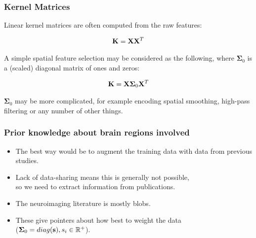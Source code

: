 
\begin{frame}
\frametitle{Kernel Matrices}
Linear kernel matrices are often computed from the raw features:\par
\begin{Large}
\begin{eqnarray*}
{\bf K} = {\bf X}{\bf X}^T
\end{eqnarray*}
\end{Large}
A simple spatial feature selection may be considered as the following, where $\boldsymbol\Sigma_0$ is a (scaled) diagonal matrix of ones and zeros:\par
\begin{Large}
\begin{eqnarray*}
{\bf K} = {\bf X}\boldsymbol\Sigma_0{\bf X}^T
\end{eqnarray*}
\end{Large}
$\boldsymbol\Sigma_0$ may be more complicated, for example encoding spatial smoothing, high-pass filtering or any number of other things.\par
\end{frame}

\begin{frame}
\frametitle{Prior knowledge about brain regions involved}
\begin{itemize}
\item The best way would be to augment the training data with data from previous studies.
\item Lack of data-sharing means this is generally not possible,\\
      so we need to extract information from publications.
\item The neuroimaging literature is mostly blobs.
\item These give pointers about how best to weight the data\\
      ($\boldsymbol\Sigma_0 = diag({\bf s}), s_i \in \mathbb{R}^+$).
\end{itemize}
\end{frame}

